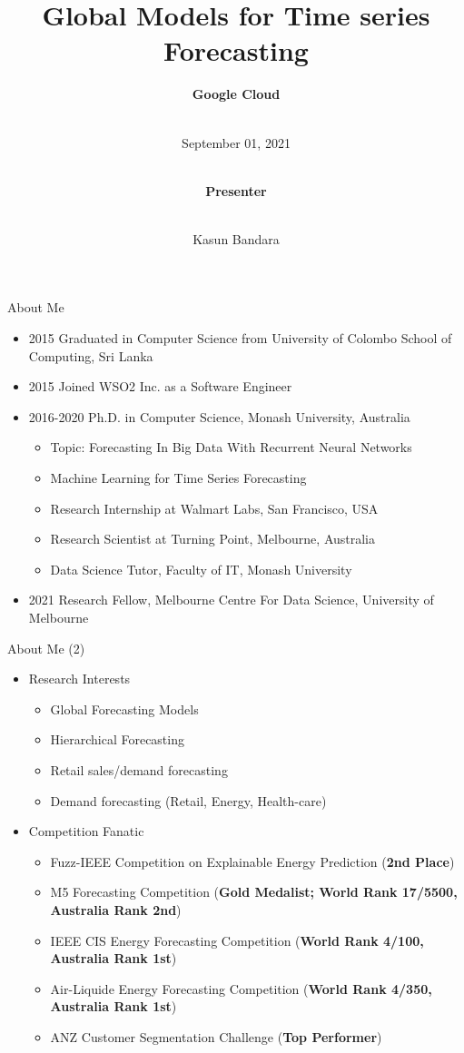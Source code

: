 \documentclass{beamer}
\title[Global Models]{Global Models for Time series Forecasting}
\author[Kasun Bandara]{\textbf{Google Cloud} \and \\\vspace{2mm} \footnotesize September 01, 2021
\and \\\vspace{3mm} \textbf{\scriptsize Presenter} \and \\\vspace{2mm} Kasun Bandara
}
\institute{School of Computing and Information Systems \\\vspace{1mm} Melbourne Centre For Data Science \\\vspace{1mm} University of Melbourne}
\date[September 01, 2021]{}
\begin{document}
\begin{frame}[plain]
  \titlepage
\end{frame}

\begin{frame}{About Me}
\begin{itemize}
\item 2015 Graduated in Computer Science from University of Colombo School of Computing, Sri Lanka
\item 2015 Joined WSO2 Inc. as a Software Engineer
\item 2016-2020 Ph.D. in Computer Science, Monash University, Australia
 \begin{itemize}
  \item Topic: Forecasting In Big Data With Recurrent Neural Networks
  \item Machine Learning for Time Series Forecasting
  \item Research Internship at Walmart Labs, San Francisco, USA
  \item Research Scientist at Turning Point, Melbourne, Australia
  \item Data Science Tutor, Faculty of IT, Monash University
 \end{itemize}
\item 2021 Research Fellow, Melbourne Centre For Data Science, University of Melbourne
\end{itemize}
\end{frame}

\begin{frame}{About Me (2)}
\begin{itemize}
\item Research Interests
\begin{itemize}
 \item Global Forecasting Models
  \item Hierarchical Forecasting
  \item Retail sales/demand forecasting
  \item Demand forecasting (Retail, Energy, Health-care)
  \end{itemize}
\item Competition Fanatic
  \begin{itemize}
  \item Fuzz-IEEE Competition on Explainable Energy Prediction (\textbf{2nd Place})
  \item M5 Forecasting Competition (\textbf{Gold Medalist; World Rank 17/5500, Australia Rank 2nd})
  \item IEEE CIS Energy Forecasting Competition (\textbf{World Rank 4/100, Australia Rank 1st})
  \item Air-Liquide Energy Forecasting Competition (\textbf{World Rank 4/350, Australia Rank 1st})
  \item ANZ Customer Segmentation Challenge (\textbf{Top Performer})
  \end{itemize}
\end{itemize}
\end{frame}
\end{document}
